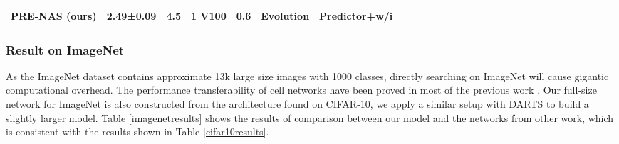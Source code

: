 \documentclass[sigconf]{acmart}
\begin{document}
\begin{table*}[!th]
\begin{tabular}{l|c|c|c|c|c|c|c}
PRE-NAS (ours)                                       & 2.49±0.09                                                                                      & 4.5                                                           & 1 V100                             & 0.6                                                                         & Evolution                                  & Predictor+w/i                                      \\ \hline
\end{tabular}
\caption{Performance comparison between the networks found by PRE-NAS and other search algorithms on CIFAR-10, the lower test error rate is better.  means the method has also been used on DARTS search space.   indicates the original paper only provided their best performance. Dash means the original paper has not provided the information. `w/i' is short for the weight inheritance training.}
\label{cifar10results}
\end{table*}

\subsubsection{Result on ImageNet}
As the ImageNet dataset contains approximate 13k large size images with 1000 classes, directly searching on ImageNet will cause gigantic computational overhead. The performance transferability of cell networks have been proved in most of the previous work \cite{Ref:10,Ref:21,Ref:35,Ref:50}. Our full-size network for ImageNet is also constructed from the architecture found on CIFAR-10, we apply a similar setup with DARTS \cite{Ref:10} to build a slightly larger model. Table \ref{imagenetresults} shows the results of comparison between our model and the networks from other work, which is consistent with the results shown in Table \ref{cifar10results}.
\end{document}
